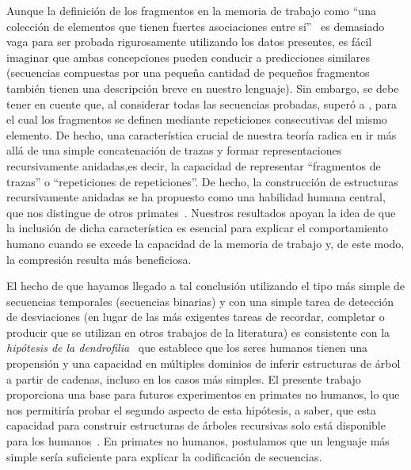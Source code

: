 Aunque la definición de los fragmentos en la memoria de trabajo como ``una colección de elementos que tienen fuertes asociaciones entre sí''~\cite{f25,f110} es demasiado vaga para ser probada rigurosamente utilizando los datos presentes, es fácil imaginar que ambas concepciones pueden conducir a predicciones similares (secuencias compuestas por una pequeña cantidad de pequeños fragmentos también tienen una descripción breve en nuestro lenguaje). Sin embargo, se debe tener en cuente que, al considerar todas las secuencias probadas, \mdlbin superó a \mdlbinfrag, para el cual los fragmentos se definen mediante repeticiones consecutivas del mismo elemento. De hecho, una característica crucial de nuestra teoría radica en ir más allá de una simple concatenación de trazas y formar representaciones recursivamente anidadas,es decir, la capacidad de representar ``fragmentos de trazas'' o ``repeticiones de repeticiones''. De hecho, la construcción de estructuras recursivamente anidadas se ha propuesto como una habilidad humana central, que nos distingue de otros primates~\cite{f4,f6,f7,f111}. Nuestros resultados apoyan la idea de que la inclusión de dicha característica es esencial para explicar el comportamiento humano cuando se excede la capacidad de la memoria de trabajo y, de este modo, la compresión resulta más beneficiosa.


El hecho de que hayamos llegado a tal conclusión utilizando el tipo más simple de secuencias temporales (secuencias binarias) y con una simple tarea de detección de desviaciones (en lugar de las más exigentes tareas de recordar, completar o producir que se utilizan en otros trabajos de la literatura) es consistente con la \textit{hipótesis de la dendrofilia}~\cite{f8} que establece que los seres humanos tienen una propensión y una capacidad en múltiples dominios de inferir estructuras de árbol a partir de cadenas, incluso en los casos más simples. El presente trabajo proporciona una base para futuros experimentos en primates no humanos, lo que nos permitiría probar el segundo aspecto de esta hipótesis, a saber, que esta capacidad para construir estructuras de árboles recursivas solo está disponible para los humanos~\cite{f4,f6,f8}. En primates no humanos, postulamos que un lenguaje más simple sería suficiente para explicar la codificación de secuencias.

